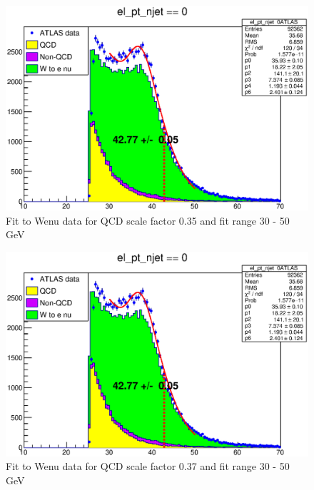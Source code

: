 \begin{figure}
\centering
\includegraphics[width=\textwidth]{data/img/halfmax_Wenu_035.eps}
\caption{Fit to Wenu data for QCD scale factor 0.35 and fit range 30 - 50 GeV}
\end{figure}
\begin{figure}
\centering
\includegraphics[width=\textwidth]{data/img/halfmax_Wenu_037.eps}
\caption{Fit to Wenu data for QCD scale factor 0.37 and fit range 30 - 50 GeV}
\end{figure}

